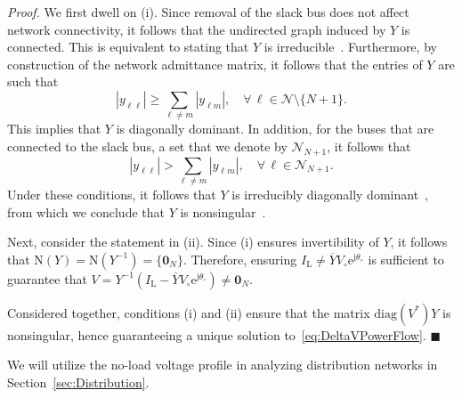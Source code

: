 \documentclass[10 pt, conference]{ieeeconf}
\newcommand{\qedblack}{\hfill \ensuremath{\blacksquare}}
\begin{document}
\noindent \emph{Proof.} We first dwell on (i).  Since removal of the slack bus does not affect network connectivity, it follows that the undirected graph induced by $Y$ is connected. This is equivalent to stating that $Y$ is irreducible~\cite[Theorem 6.2.24]{Horn:2013}. Furthermore, by construction of the network admittance matrix, it follows that the entries of $Y$ are such that
\begin{equation*}
|y_{\ell \ell}| \geq \sum_{\ell \neq m} |y_{\ell m}|, \quad \forall \, \ell \in \mathcal{N}\setminus\{ N + 1\}.
\end{equation*}
This implies that $Y$ is diagonally dominant. In addition, for the buses that are connected to the slack bus, a set that we denote by $\mathcal{N}_{N+1}$, it follows that 
\begin{equation*}
|y_{\ell \ell}| > \sum_{\ell \neq m} |y_{\ell m}|, \quad \forall \, \ell \in \mathcal{N}_{N+1}.
\end{equation*}
Under these conditions, it follows that $Y$ is irreducibly diagonally dominant~\cite[Definition 6.2.25]{Horn:2013}, from which we conclude that $Y$ is nonsingular~\cite[Corollary 6.2.27]{Horn:2013}. 

Next, consider the statement in (ii). Since (i) ensures invertibility of $Y$, it follows that $\mathrm{N}(Y) = \mathrm{N}(Y^{-1})= \{\mathbf{0}_N\}$. Therefore, ensuring $I_\mathrm L \neq \overline Y V_\circ \mathrm e^{\mathrm j \theta_\circ}$ is sufficient to guarantee that $V = Y^{-1}\left(I_\mathrm L - \overline Y V_\circ \mathrm e^{\mathrm j \theta_\circ} \right) \neq \mathbf{0}_N$.	

Considered together, conditions (i) and (ii) ensure that the matrix $\mathrm{diag}\left(V^*\right) Y$ is nonsingular, hence guaranteeing a unique solution to~\eqref{eq:DeltaVPowerFlow}. 
\qedblack

We will utilize the no-load voltage profile in analyzing distribution networks in Section~\ref{sec:Distribution}.
\end{document}
